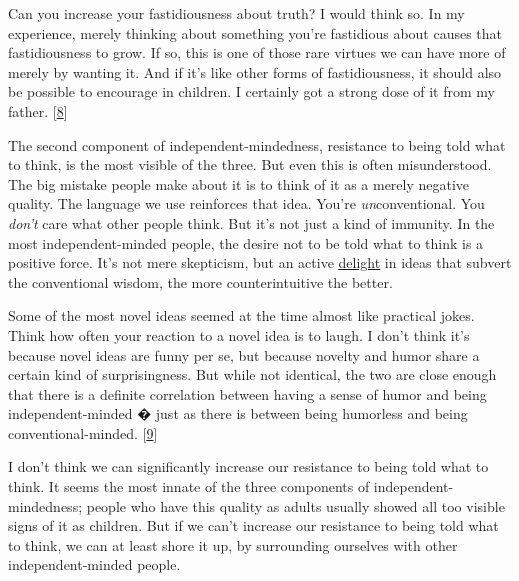 Can you increase your fastidiousness about truth?
                  I would think so. In my experience, merely thinking about
                  something you're fastidious about causes that fastidiousness
                  to grow. If so, this is one of those rare virtues we can have
                  more of merely by wanting it. And if it's like other forms of
                  fastidiousness, it should also be possible to encourage in
                  children. I certainly got a strong dose of it from my father.
                  [\href{\#f8n}{8}]

The second component of independent-mindedness,
                  resistance to being told what to think, is the most visible of
                  the three. But even this is often misunderstood. The big
                  mistake people make about it is to think of it as a merely
                  negative quality. The language we use reinforces that idea.
                  You're \emph{un}conventional. You \emph{don't} care what other
                  people think. But it's not just a kind of immunity. In the
                  most independent-minded people, the desire not to be told what
                  to think is a positive force. It's not mere skepticism, but an
                  active \href{http://www.paulgraham.com/gba.html}{\underline{delight}} in ideas that
                  subvert the conventional wisdom, the more counterintuitive the
                  better.

Some of the most novel ideas seemed at the
                  time almost like practical jokes. Think how often your
                  reaction to a novel idea is to laugh. I don't think it's
                  because novel ideas are funny per se, but because novelty and
                  humor share a certain kind of surprisingness. But while not
                  identical, the two are close enough that there is a definite
                  correlation between having a sense of humor and being
                  independent-minded � just as there is between being humorless
                  and being conventional-minded.
                  [\href{\#f9n}{9}]

I don't think we can significantly increase our
                  resistance to being told what to think. It seems the most
                  innate of the three components of independent-mindedness;
                  people who have this quality as adults usually showed all too
                  visible signs of it as children. But if we can't increase our
                  resistance to being told what to think, we can at least shore
                  it up, by surrounding ourselves with other independent-minded
                  people.

